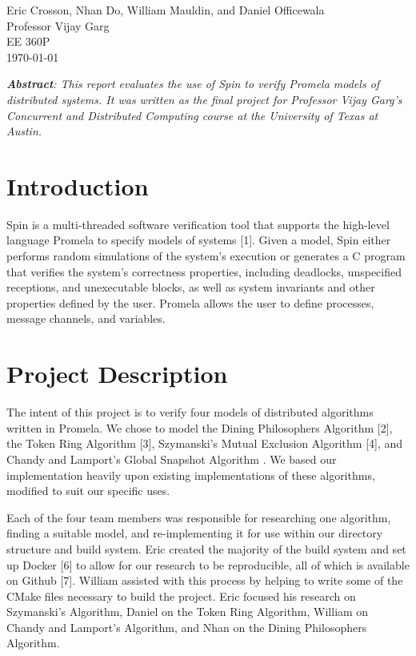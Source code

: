 \documentclass[12pt]{article}
\begin{document}
\begin{flushleft}
Eric Crosson, Nhan Do, William Mauldin, and Daniel Officewala \\
Professor Vijay Garg\\
EE 360P \\
\today \\

\begin{center}
  \emph{\textbf{Abstract}: This report evaluates the use of Spin to verify
    Promela models of distributed systems. It was written as the final project
    for Professor Vijay Garg's Concurrent and Distributed Computing course at
    the University of Texas at Austin.}
\end{center}

\setlength{\parindent}{0.5in}
\section{Introduction}
Spin is a multi-threaded software verification tool that supports the high-level
language Promela to specify models of systems [1]. Given a model, Spin either
performs random simulations of the system's execution or generates a C program
that verifies the system's correctness properties, including deadlocks,
unspecified receptions, and unexecutable blocks, as well as system invariants
and other properties defined by the user. Promela allows the user to define
processes, message channels, and variables.

\section{Project Description}
The intent of this project is to verify four models of distributed algorithms
written in Promela. We chose to model the Dining Philosophers Algorithm [2], the
Token Ring Algorithm [3], Szymanski's Mutual Exclusion Algorithm [4], and Chandy
and Lamport's Global Snapshot Algorithm \cite{ch:01}. We based our implementation heavily
upon existing implementations of these algorithms, modified to suit our specific
uses.

Each of the four team members was responsible for researching one algorithm,
finding a suitable model, and re-implementing it for use within our directory
structure and build system. Eric created the majority of the build system and
set up Docker [6] to allow for our research to be reproducible, all of which is
available on Github [7]. William assisted with this process by helping to write
some of the CMake files necessary to build the project. Eric focused his
research on Szymanski's Algorithm, Daniel on the Token Ring Algorithm, William
on Chandy and Lamport's Algorithm, and Nhan on the Dining Philosophers
Algorithm.


\end{flushleft}
\end{document}
